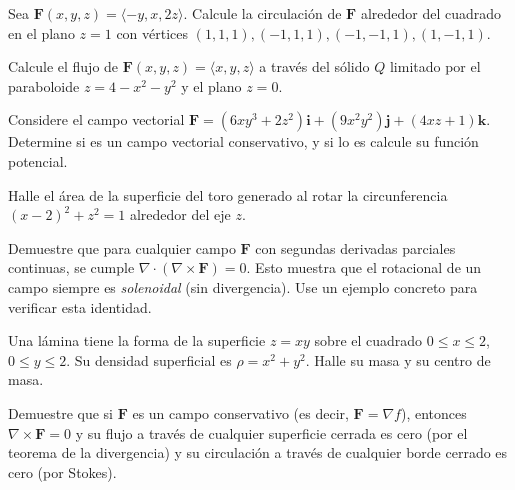 \begin{prob}
Sea $\mathbf{F}(x,y,z)=\langle -y, x, 2z\rangle$. Calcule la circulación de $\mathbf{F}$ alrededor del cuadrado en el plano $z=1$ con vértices $(1,1,1),(-1,1,1),(-1,-1,1),(1,-1,1)$.
\end{prob}

\begin{prob}
Calcule el flujo de $\mathbf{F}(x,y,z)=\langle x, y, z\rangle$ a través del sólido $Q$ limitado por el paraboloide $z=4-x^2-y^2$ y el plano $z=0$.
\end{prob}

\begin{prob}
Considere el campo vectorial $\mathbf{F}=\left(6xy^3+2z^2\right)\mathbf{i}+\left(9x^2y^2\right)\mathbf{j}+\left(4xz+1\right)\mathbf{k}$. Determine si es un campo vectorial conservativo, y si lo es calcule su función potencial.
\end{prob}

\begin{prob}
Halle el área de la superficie del toro generado al rotar la circunferencia $(x-2)^2+z^2=1$ alrededor del eje $z$.
\end{prob}

\begin{prob}
Demuestre que para cualquier campo $\mathbf{F}$ con segundas derivadas
parciales continuas, se cumple $\nabla \cdot (\nabla \times \mathbf{F})
= 0$. Esto muestra que el rotacional de un campo siempre es
\emph{solenoidal} (sin divergencia). Use un ejemplo concreto para
verificar esta identidad.
\end{prob}

\begin{prob}
Una lámina tiene la forma de la superficie $z=xy$ sobre el cuadrado $0\le x\le 2$, $0\le y\le 2$. Su densidad superficial es $\rho=x^2+y^2$. Halle su masa y su centro de masa.
\end{prob}

\begin{prob}
Demuestre que si $\mathbf{F}$ es un campo conservativo (es decir, $\mathbf{F}=\nabla f$), entonces $\nabla\times\mathbf{F}=0$ y su flujo a través de cualquier superficie cerrada es cero (por el teorema de la divergencia) y su circulación a través de cualquier borde cerrado es cero (por Stokes).
\end{prob}
